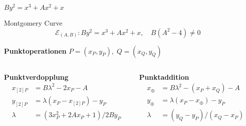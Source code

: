 \begin{frame}{$By^2=x^3+Ax^2+x$}
    \begin{definitionblock}{Montgomery Curve}
        \[
        \mathcal{E}_{(A,B)}:By^2=x^3+Ax^2+x, \quad B(A^2-4)\neq0
        \]
    \end{definitionblock}
    \vspace{1em}
        

    \hline
    \vspace{1em}
    \textbf{Punktoperationen}
    $P=(x_P,y_P),\;Q=(x_Q,y_Q)$
    
            
       
    \begin{columns}
    \begin{column}{0.5\linewidth}
        \begin{center}
            \textbf{Punktverdopplung}
            \begin{align*}
                x_{[2]P} &= B\lambda^2 - 2x_P - A \\
                y_{[2]P} &= \lambda(x_P - x_{[2]P}) - y_P \\
                \lambda &= (3x_P^2 + 2Ax_P + 1)/2By_P
            \end{align*}
        \end{center}
        \vfill
    \end{column}
    \begin{column}{0.5\linewidth}
        \begin{center}
            \textbf{Punktaddition}
            \begin{align*}
                x_\oplus &= B\lambda^2 - (x_P + x_Q) - A \\
                y_\oplus &= \lambda(x_P - x_\oplus) - y_P \\
                \lambda &= (y_Q - y_P)/(x_Q - x_P)
            \end{align*}
        \end{center}
        \vfill
    \end{column}
\end{columns}
    
\end{frame}